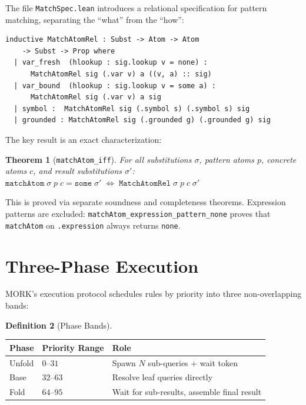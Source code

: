 \documentclass[11pt]{article}
\newtheorem{theorem}{Theorem}[section]
\theoremstyle{definition}
\newtheorem{definition}[theorem]{Definition}
\theoremstyle{remark}
\newcommand{\MORK}{\textup{MORK}}
\begin{document}
The file \texttt{MatchSpec.lean} introduces a relational specification for
pattern matching, separating the ``what'' from the ``how'':

\begin{lstlisting}[caption={Match relation (\texttt{MatchSpec.lean}).}]
inductive MatchAtomRel : Subst -> Atom -> Atom
    -> Subst -> Prop where
  | var_fresh  (hlookup : sig.lookup v = none) :
      MatchAtomRel sig (.var v) a ((v, a) :: sig)
  | var_bound  (hlookup : sig.lookup v = some a) :
      MatchAtomRel sig (.var v) a sig
  | symbol :  MatchAtomRel sig (.symbol s) (.symbol s) sig
  | grounded : MatchAtomRel sig (.grounded g) (.grounded g) sig
\end{lstlisting}

The key result is an exact characterization:

\begin{theorem}[\texttt{matchAtom\_iff}]
For all substitutions $\sigma$, pattern atoms $p$, concrete atoms $c$, and
result substitutions $\sigma'$:
$
  \mathtt{matchAtom}\;\sigma\;p\;c = \mathtt{some}\;\sigma'
  \;\iff\;
  \mathtt{MatchAtomRel}\;\sigma\;p\;c\;\sigma'
$
\end{theorem}

\noindent
This is proved via separate soundness and completeness theorems.
Expression patterns are excluded: \texttt{matchAtom\_expression\_pattern\_none}
proves that \texttt{matchAtom} on \texttt{.expression} always returns
\texttt{none}.

\section{Three-Phase Execution}
\label{sec:threephase}

\MORK{}'s execution protocol schedules rules by priority into three
non-overlapping bands:

\begin{definition}[Phase Bands]
\begin{center}
\begin{tabular}{@{}lll@{}}
\toprule
\textbf{Phase} & \textbf{Priority Range} & \textbf{Role} \\
\midrule
Unfold & $0$--$31$   & Spawn $N$ sub-queries + wait token \\
Base   & $32$--$63$  & Resolve leaf queries directly \\
Fold   & $64$--$95$  & Wait for sub-results, assemble final result \\
\bottomrule
\end{tabular}
\end{center}
\end{definition}
\end{document}

